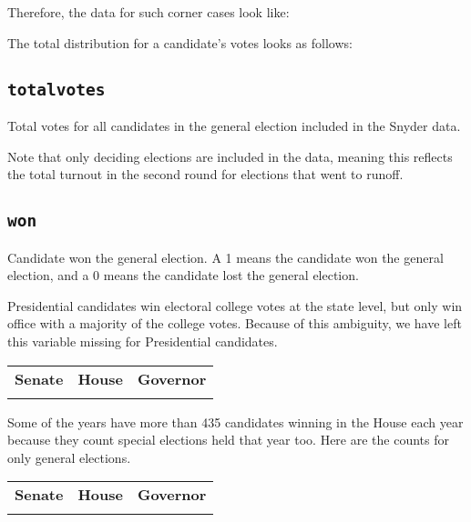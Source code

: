\documentclass[12pt]{article}
\begin{document}
Therefore, the data for such corner cases look like:

\begin{table}[!h]
\centering
\footnotesize

\end{table}


The total distribution for a candidate's votes looks as follows:

\begin{table}[!h]
\centering
\footnotesize

\end{table}


\FloatBarrier

\subsection*{\texttt{totalvotes}}

Total votes for all candidates in the general election included in the Snyder data. 

Note that only deciding elections are included in the data, meaning this reflects the total turnout in the second round for elections that went to runoff. 

\subsection*{\texttt{won}} 
Candidate won the general election. A 1 means the candidate won the general election, and a 0 means the candidate lost the general election. 

Presidential candidates win electoral college votes at the state level, but only win office with a majority of the college votes. Because of this ambiguity, we have left this variable missing for Presidential candidates.

    \begin{tabularx}{\linewidth}{CCC}
    \textbf{Senate} & \textbf{House} & \textbf{Governor}\\
     &  & 
    \end{tabularx}

Some of the years have more than 435 candidates winning in the House each year because they count special elections held that year too. Here are the counts for only general elections.

\begin{tabularx}{\linewidth}{CCC}
    \textbf{Senate} & \textbf{House} & \textbf{Governor}\\
     &  & 
    \end{tabularx}
\end{document}
